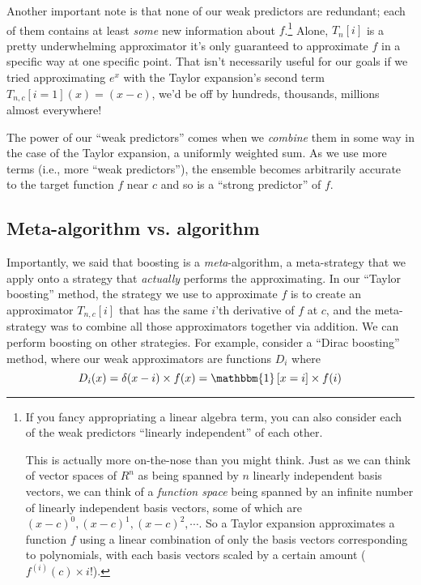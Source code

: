 \documentclass[letterpaper,12pt]{report}
\begin{document}
Another important note is that none of our weak predictors are redundant; each of them
contains at least \emph{some} new information about \(f\).\footnote{
  If you fancy appropriating a linear algebra term, you can also consider each of the weak
  predictors ``linearly independent'' of each other. 

  This is actually more on-the-nose than
  you might think. Just as we can think of vector spaces of \(R^n\) as being spanned by
  \(n\) linearly independent basis vectors, we can think of a 
  \emph{function space} being
  spanned by an infinite number of linearly independent basis vectors, some of which
  are \((x-c)^0, (x-c)^1, (x-c)^2, \cdots\). 
  So a Taylor expansion approximates a function \(f\) using a linear combination of
  only the basis vectors corresponding to polynomials, with each basis vectors scaled 
  by a certain amount (\(f^{(i)}(c) \times {i!}\)).
}
Alone, \(T_n[i]\) is a pretty underwhelming approximator \textendash{} it's only guaranteed to
approximate \(f\) in a specific way at one specific point. 
That isn't necessarily useful for our goals \textemdash{}
if we tried approximating \(e^x\) with the Taylor expansion's second term
\(T_{n,c}[i = 1](x) = (x - c)\), we'd be off by hundreds, thousands, millions almost everywhere!

The power of our ``weak predictors'' comes when we \emph{combine} them in some way 
\textemdash{} in the case of the Taylor expansion, a uniformly weighted sum. 
As we use more terms (i.e., more ``weak predictors''),
the ensemble becomes arbitrarily accurate to the target function \(f\) near \(c\) and so is
a ``strong predictor'' of \(f\).



\subsection{Meta-algorithm vs. algorithm}\label{meta-algorithm-vs-algorithm}

Importantly, we said that boosting is a \emph{meta}-algorithm, a meta-strategy that we
apply onto a strategy that \emph{actually} performs the approximating. 
In our ``Taylor boosting'' method, the strategy we use to approximate \(f\) is to create an
approximator \(T_{n,c}[i]\) that has the same \(i\)'th derivative of \(f\) at \(c\), and the
meta-strategy was to combine all those approximators together via addition. We can perform
boosting on other strategies. For example, consider a ``Dirac boosting'' method, where our
weak approximators are functions \(D_i\) where
\[D_i(x) = \delta(x-i) \times f(x) = \mathbbm{1}\left[x = i\right] \times f(i) \]
\end{document}
